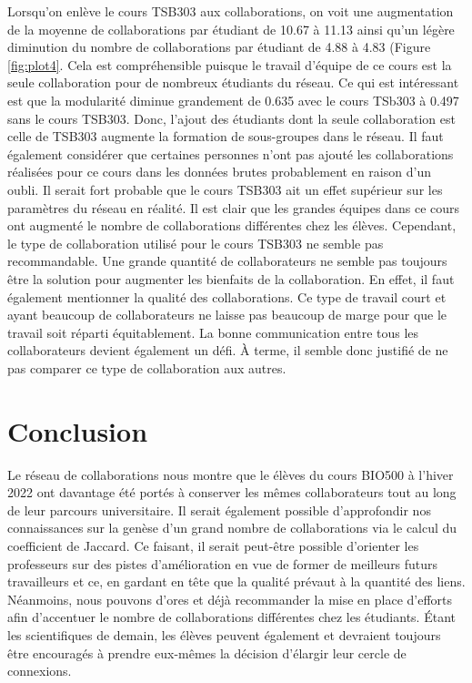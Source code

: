 \documentclass[9pt,twocolumn,twoside,]{pnas-new}
\begin{document}
Lorsqu'on enlève le cours TSB303 aux collaborations, on voit une
augmentation de la moyenne de collaborations par étudiant de 10.67 à
11.13 ainsi qu'un légère diminution du nombre de collaborations par
étudiant de 4.88 à 4.83 (Figure \ref{fig:plot4}. Cela est compréhensible
puisque le travail d'équipe de ce cours est la seule collaboration pour
de nombreux étudiants du réseau. Ce qui est intéressant est que la
modularité diminue grandement de 0.635 avec le cours TSb303 à 0.497 sans
le cours TSB303. Donc, l'ajout des étudiants dont la seule collaboration
est celle de TSB303 augmente la formation de sous-groupes dans le
réseau. Il faut également considérer que certaines personnes n'ont pas
ajouté les collaborations réalisées pour ce cours dans les données
brutes probablement en raison d'un oubli. Il serait fort probable que le
cours TSB303 ait un effet supérieur sur les paramètres du réseau en
réalité. Il est clair que les grandes équipes dans ce cours ont augmenté
le nombre de collaborations différentes chez les élèves. Cependant, le
type de collaboration utilisé pour le cours TSB303 ne semble pas
recommandable. Une grande quantité de collaborateurs ne semble pas
toujours être la solution pour augmenter les bienfaits de la
collaboration. En effet, il faut également mentionner la qualité des
collaborations. Ce type de travail court et ayant beaucoup de
collaborateurs ne laisse pas beaucoup de marge pour que le travail soit
réparti équitablement. La bonne communication entre tous les
collaborateurs devient également un défi. À terme, il semble donc
justifié de ne pas comparer ce type de collaboration aux autres.

\hypertarget{conclusion}{%
\section{Conclusion}\label{conclusion}}

Le réseau de collaborations nous montre que le élèves du cours BIO500 à
l'hiver 2022 ont davantage été portés à conserver les mêmes
collaborateurs tout au long de leur parcours universitaire. Il serait
également possible d'approfondir nos connaissances sur la genèse d'un
grand nombre de collaborations via le calcul du coefficient de Jaccard.
Ce faisant, il serait peut-être possible d'orienter les professeurs sur
des pistes d'amélioration en vue de former de meilleurs futurs
travailleurs et ce, en gardant en tête que la qualité prévaut à la
quantité des liens. Néanmoins, nous pouvons d'ores et déjà recommander
la mise en place d'efforts afin d'accentuer le nombre de collaborations
différentes chez les étudiants. Étant les scientifiques de demain, les
élèves peuvent également et devraient toujours être encouragés à prendre
eux-mêmes la décision d'élargir leur cercle de connexions.
\end{document}
